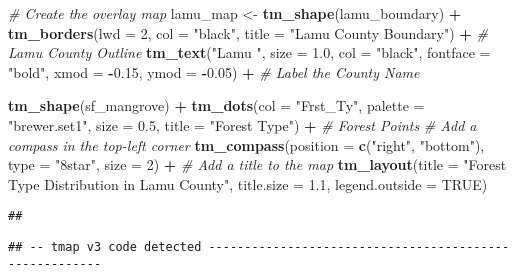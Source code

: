\documentclass[
]{article}
\newenvironment{Shaded}{\begin{snugshade}}{\end{snugshade}}
\newcommand{\AttributeTok}[1]{\textcolor[rgb]{0.13,0.29,0.53}{#1}}
\newcommand{\CommentTok}[1]{\textcolor[rgb]{0.56,0.35,0.01}{\textit{#1}}}
\newcommand{\ConstantTok}[1]{\textcolor[rgb]{0.56,0.35,0.01}{#1}}
\newcommand{\DecValTok}[1]{\textcolor[rgb]{0.00,0.00,0.81}{#1}}
\newcommand{\FloatTok}[1]{\textcolor[rgb]{0.00,0.00,0.81}{#1}}
\newcommand{\FunctionTok}[1]{\textcolor[rgb]{0.13,0.29,0.53}{\textbf{#1}}}
\newcommand{\NormalTok}[1]{#1}
\newcommand{\OtherTok}[1]{\textcolor[rgb]{0.56,0.35,0.01}{#1}}
\newcommand{\SpecialCharTok}[1]{\textcolor[rgb]{0.81,0.36,0.00}{\textbf{#1}}}
\newcommand{\StringTok}[1]{\textcolor[rgb]{0.31,0.60,0.02}{#1}}
\begin{document}
\begin{Shaded}
\begin{Highlighting}[]
\CommentTok{\# Create the overlay map}
\NormalTok{lamu\_map }\OtherTok{\textless{}{-}} \FunctionTok{tm\_shape}\NormalTok{(lamu\_boundary) }\SpecialCharTok{+} 
  \FunctionTok{tm\_borders}\NormalTok{(}\AttributeTok{lwd =} \DecValTok{2}\NormalTok{, }\AttributeTok{col =} \StringTok{"black"}\NormalTok{, }\AttributeTok{title =} \StringTok{"Lamu County Boundary"}\NormalTok{) }\SpecialCharTok{+}  \CommentTok{\# Lamu County Outline}
  \FunctionTok{tm\_text}\NormalTok{(}\StringTok{"Lamu "}\NormalTok{, }\AttributeTok{size =} \FloatTok{1.0}\NormalTok{, }\AttributeTok{col =} \StringTok{"black"}\NormalTok{, }\AttributeTok{fontface =} \StringTok{"bold"}\NormalTok{, }\AttributeTok{xmod =} \SpecialCharTok{{-}}\FloatTok{0.15}\NormalTok{, }\AttributeTok{ymod =} \SpecialCharTok{{-}}\FloatTok{0.05}\NormalTok{) }\SpecialCharTok{+}        \CommentTok{\# Label the County Name}
  
  \FunctionTok{tm\_shape}\NormalTok{(sf\_mangrove) }\SpecialCharTok{+} 
  \FunctionTok{tm\_dots}\NormalTok{(}\AttributeTok{col =} \StringTok{"Frst\_Ty"}\NormalTok{, }\AttributeTok{palette =} \StringTok{"brewer.set1"}\NormalTok{, }\AttributeTok{size =} \FloatTok{0.5}\NormalTok{, }\AttributeTok{title =} \StringTok{"Forest Type"}\NormalTok{) }\SpecialCharTok{+}  \CommentTok{\# Forest Points}
\CommentTok{\# Add a compass in the top{-}left corner}
  \FunctionTok{tm\_compass}\NormalTok{(}\AttributeTok{position =} \FunctionTok{c}\NormalTok{(}\StringTok{"right"}\NormalTok{, }\StringTok{"bottom"}\NormalTok{), }\AttributeTok{type =} \StringTok{"8star"}\NormalTok{, }\AttributeTok{size =} \DecValTok{2}\NormalTok{) }\SpecialCharTok{+}
  \CommentTok{\# Add a title to the map}
  \FunctionTok{tm\_layout}\NormalTok{(}\AttributeTok{title =} \StringTok{"Forest Type Distribution in Lamu County"}\NormalTok{, }
            \AttributeTok{title.size =} \FloatTok{1.1}\NormalTok{,}
            \AttributeTok{legend.outside =} \ConstantTok{TRUE}\NormalTok{) }
\end{Highlighting}
\end{Shaded}

\begin{verbatim}
## 
\end{verbatim}

\begin{verbatim}
## -- tmap v3 code detected -------------------------------------------------------
\end{verbatim}
\end{document}
